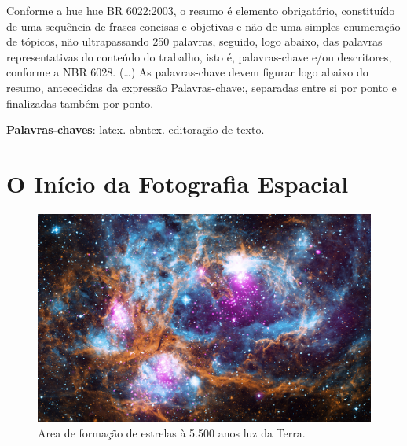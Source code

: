 \documentclass[
	article,			%
	12pt,				%
	oneside,			%
	a4paper,			%
	english,			%
	brazil,				%
	sumario=tradicional
	]{abntex2}
\begin{document}
\frenchspacing 


%
%
\maketitle

\begin{resumoumacoluna}
 Conforme a hue hue BR 6022:2003, o resumo é elemento obrigatório, constituído de
 uma sequência de frases concisas e objetivas e não de uma simples enumeração
 de tópicos, não ultrapassando 250 palavras, seguido, logo abaixo, das palavras
 representativas do conteúdo do trabalho, isto é, palavras-chave e/ou
 descritores, conforme a NBR 6028. (\ldots) As palavras-chave devem figurar logo
 abaixo do resumo, antecedidas da expressão Palavras-chave:, separadas entre si por
 ponto e finalizadas também por ponto.
 
 \vspace{\onelineskip}
 
 \noindent
 \textbf{Palavras-chaves}: latex. abntex. editoração de texto.
\end{resumoumacoluna}

\textual{}

\section{O Início da Fotografia Espacial}

\begin{figure}[ht]
	\includegraphics[width=\linewidth]{img/ngc6357_big.jpg}
	\caption{Area de formação de estrelas à 5.500 anos luz da Terra.}
	\label{fig:starformation}
	\centering
\end{figure}
\end{document}
